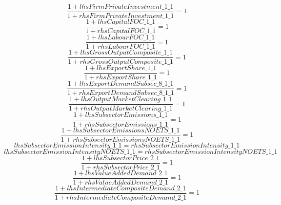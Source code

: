 \begin{dmath}
\frac{1+{lhsFirmPrivateInvestment\_1\_1}}{1+{rhsFirmPrivateInvestment\_1\_1}}=1
\end{dmath}
\begin{dmath}
\frac{1+{lhsCapitalFOC\_1\_1}}{1+{rhsCapitalFOC\_1\_1}}=1
\end{dmath}
\begin{dmath}
\frac{1+{lhsLabourFOC\_1\_1}}{1+{rhsLabourFOC\_1\_1}}=1
\end{dmath}
\begin{dmath}
\frac{1+{lhsGrossOutputComposite\_1\_1}}{1+{rhsGrossOutputComposite\_1\_1}}=1
\end{dmath}
\begin{dmath}
\frac{1+{lhsExportShare\_1\_1}}{1+{rhsExportShare\_1\_1}}=1
\end{dmath}
\begin{dmath}
\frac{1+{lhsExportDemandSubsec\_8\_1\_1}}{1+{rhsExportDemandSubsec\_8\_1\_1}}=1
\end{dmath}
\begin{dmath}
\frac{1+{lhsOutputMarketClearing\_1\_1}}{1+{rhsOutputMarketClearing\_1\_1}}=1
\end{dmath}
\begin{dmath}
\frac{1+{lhsSubsectorEmissions\_1\_1}}{1+{rhsSubsectorEmissions\_1\_1}}=1
\end{dmath}
\begin{dmath}
\frac{1+{lhsSubsectorEmissionsNOETS\_1\_1}}{1+{rhsSubsectorEmissionsNOETS\_1\_1}}=1
\end{dmath}
\begin{dmath}
{lhsSubsectorEmissionIntensity\_1\_1}={rhsSubsectorEmissionIntensity\_1\_1}
\end{dmath}
\begin{dmath}
{lhsSubsectorEmissionIntensityNOETS\_1\_1}={rhsSubsectorEmissionIntensityNOETS\_1\_1}
\end{dmath}
\begin{dmath}
\frac{1+{lhsSubsectorPrice\_2\_1}}{1+{rhsSubsectorPrice\_2\_1}}=1
\end{dmath}
\begin{dmath}
\frac{1+{lhsValueAddedDemand\_2\_1}}{1+{rhsValueAddedDemand\_2\_1}}=1
\end{dmath}
\begin{dmath}
\frac{1+{lhsIntermediateCompositeDemand\_2\_1}}{1+{rhsIntermediateCompositeDemand\_2\_1}}=1
\end{dmath}
